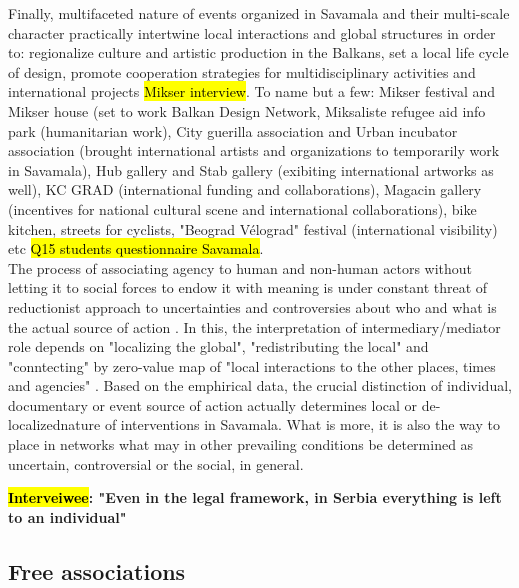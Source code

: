 \documentclass[11pt]{report}
\begin{document}
Finally, multifaceted nature of events organized in Savamala and their multi-scale character practically intertwine local interactions and global structures in order to:
regionalize culture and artistic production in the Balkans,
set a local life cycle of design,
promote cooperation strategies for multidisciplinary activities and international projects \hl{Mikser interview}.
To name but a few:
Mikser festival and Mikser house (set to work Balkan Design Network,
Miksaliste refugee aid info park (humanitarian work), 
City guerilla association and Urban incubator association (brought international artists and organizations to temporarily work in Savamala),
Hub gallery and Stab gallery (exibiting international artworks as well),
KC GRAD (international funding and collaborations),
Magacin gallery (incentives for national cultural scene and international collaborations),
bike kitchen, streets for cyclists, "Beograd Vélograd" festival (international visibility)
etc
\hl{Q15 students questionnaire Savamala}.
\\
The process of associating agency to human and non-human actors without letting it to social forces to endow it with meaning is under constant threat of reductionist approach to uncertainties and controversies about who and what is the actual source of action \cite{Latour 2005}. In this, the interpretation of intermediary/mediator role depends on "localizing the global", "redistributing the local" and "conntecting" by zero-value map of "local interactions to the other places, times and agencies" \cite{Latour 2005}. Based on the emphirical data, the crucial distinction of individual, documentary or event source of action actually determines local or de-localized\footnotemark nature of interventions in Savamala. What is more, it is also the way to place in networks what may in other prevailing conditions be determined as uncertain, controversial or the social, in general.

\textbf{\hl{Interveiwee}:
"Even in the legal framework, in Serbia everything is left to an individual"}

\subsection{Free associations}
\end{document}
